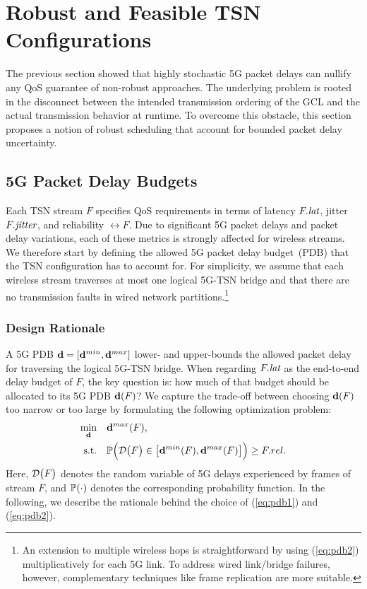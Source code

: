 \section{Robust and Feasible TSN Configurations} \label{sec:robustness_and_feasibility}
The previous section showed that highly stochastic 5G packet delays can nullify any QoS guarantee of non-robust approaches.
The underlying problem is rooted in the disconnect between the intended transmission ordering of the GCL and the actual transmission behavior at runtime. 
To overcome this obstacle, this section proposes a notion of robust scheduling that account for bounded packet delay uncertainty. 

\subsection{5G Packet Delay Budgets} \label{sec:robustness:pdb}
Each TSN stream $F$ specifies QoS requirements in terms of latency $F.\textit{lat}$, jitter $F.\textit{jitter}$, and reliability $\rel{F}$.
Due to significant 5G packet delays and packet delay variations, each of these metrics is strongly affected for wireless streams.
We therefore start by defining the allowed 5G packet delay budget~(PDB) that the TSN configuration has to account for.
For simplicity, we assume that each wireless stream traverses at most one logical 5G-TSN bridge and that there are no transmission faults in wired network partitions.\footnote{
  An extension to multiple wireless hops is straightforward by using (\ref{eq:pdb2}) multiplicatively for each 5G link.
  To address wired link/bridge failures, however, complementary techniques like frame replication are more suitable.
}

\subsubsection{Design Rationale}
A 5G PDB $\dpdb{} = [\dpdbmin{}, \dpdbmax{}]$ lower- and upper-bounds the allowed packet delay for traversing the logical 5G-TSN bridge. 
When regarding $F.\textit{lat}$ as the end-to-end delay budget of $F$, the key question is: how much of that budget should be allocated to its 5G PDB $\dpdb{F}$?
We capture the trade-off between choosing $\dpdb{F}$ too narrow or too large by formulating the following optimization problem:
\begin{subequations} \label{eq:pdb}
\begin{align}
  \min_{\dpdb{}} \quad &\dpdbmax{F}, \label{eq:pdb1}\\
  \text{s.t.} \quad &\Prob\Big(\D{F} \in \dpdbfull{F}\Big) \geq \rel{F}. \label{eq:pdb2}
\end{align}
\end{subequations}
Here, $\D{F}$ denotes the random variable of 5G delays experienced by frames of stream $F$, and $\mathbb{P}(\cdot)$ denotes the corresponding probability function.
In the following, we describe the rationale behind the choice of (\ref{eq:pdb1}) and (\ref{eq:pdb2}).

